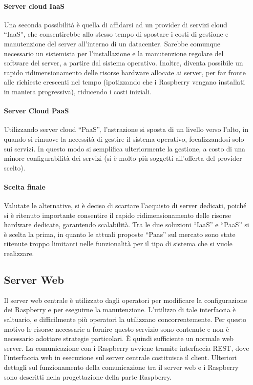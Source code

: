 \paragraph{Server cloud IaaS}
Una seconda possibilità è quella di affidarsi ad un provider di servizi cloud ``IaaS'', che consentirebbe allo stesso tempo di spostare i costi di gestione e manutenzione del server all'interno di un datacenter. Sarebbe comunque necessario un sistemista per l'installazione e la manutenzione regolare del software del server, a partire dal sistema operativo. Inoltre, diventa possibile un rapido ridimensionamento delle risorse hardware allocate ai server, per far fronte alle richieste crescenti nel tempo (ipotizzando che i Raspberry vengano installati in maniera progressiva), riducendo i costi iniziali.
\paragraph{Server Cloud PaaS}
Utilizzando server cloud ``PaaS'', l'astrazione si sposta di un livello verso l'alto, in quando si rimuove la necessità di gestire il sistema operativo, focalizzandosi solo sui servizi. In questo modo si semplifica ulteriormente la gestione, a costo di una minore configurabilità dei servizi (si è molto più soggetti all'offerta del provider scelto).
\paragraph{Scelta finale}
Valutate le alternative, si è deciso di scartare l'acquisto di server dedicati, poiché si è ritenuto importante consentire il rapido ridimensionamento delle risorse hardware dedicate, garantendo scalabilità. Tra le due soluzioni ``IaaS'' e ``PaaS'' si è scelta la prima, in quanto le attuali proposte ``Paas'' sul mercato sono state ritenute troppo limitanti nelle funzionalità per il tipo di sistema che si vuole realizzare.

\subsection{Server Web}
Il server web centrale è utilizzato dagli operatori per modificare la configurazione dei Raspberry e per eseguirne la manutenzione. L'utilizzo di tale interfaccia è saltuario, e difficilmente più operatori la utilizzano concorrentemente. Per questo motivo le risorse necessarie a fornire questo servizio sono contenute e non è necessario adottare strategie particolari. È quindi sufficiente un normale web server. La comunicazione con i Raspberry avviene tramite interfaccia REST, dove l'interfaccia web in esecuzione sul server centrale costituisce il client. Ulteriori dettagli sul funzionamento della comunicazione tra il server web e i Raspberry sono descritti nella progettazione della parte Raspberry.


